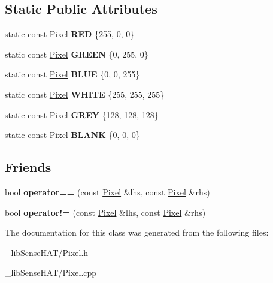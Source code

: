 \subsection*{Static Public Attributes}
\begin{DoxyCompactItemize}
\item 
static const \hyperlink{class_pixel}{Pixel} {\bfseries R\+ED} \{255, 0, 0\}\hypertarget{class_pixel_a0873aef3100f5b2400ee7ca185bf263a}{}\label{class_pixel_a0873aef3100f5b2400ee7ca185bf263a}

\item 
static const \hyperlink{class_pixel}{Pixel} {\bfseries G\+R\+E\+EN} \{0, 255, 0\}\hypertarget{class_pixel_af1e95f87b82dedb916c81f427b3eb68a}{}\label{class_pixel_af1e95f87b82dedb916c81f427b3eb68a}

\item 
static const \hyperlink{class_pixel}{Pixel} {\bfseries B\+L\+UE} \{0, 0, 255\}\hypertarget{class_pixel_a64e919862b4e618715e6d6dba7671112}{}\label{class_pixel_a64e919862b4e618715e6d6dba7671112}

\item 
static const \hyperlink{class_pixel}{Pixel} {\bfseries W\+H\+I\+TE} \{255, 255, 255\}\hypertarget{class_pixel_a12c08beec64c8d57bdd9ef3b49244aa3}{}\label{class_pixel_a12c08beec64c8d57bdd9ef3b49244aa3}

\item 
static const \hyperlink{class_pixel}{Pixel} {\bfseries G\+R\+EY} \{128, 128, 128\}\hypertarget{class_pixel_a67edde6c97818a595235295f750b50fd}{}\label{class_pixel_a67edde6c97818a595235295f750b50fd}

\item 
static const \hyperlink{class_pixel}{Pixel} {\bfseries B\+L\+A\+NK} \{0, 0, 0\}\hypertarget{class_pixel_a77c8aab7dad0995df6fdc8ccf65e92ee}{}\label{class_pixel_a77c8aab7dad0995df6fdc8ccf65e92ee}

\end{DoxyCompactItemize}
\subsection*{Friends}
\begin{DoxyCompactItemize}
\item 
bool {\bfseries operator==} (const \hyperlink{class_pixel}{Pixel} \&lhs, const \hyperlink{class_pixel}{Pixel} \&rhs)\hypertarget{class_pixel_aacd4ab1e37e7b6507b3580d2a3cd0fd9}{}\label{class_pixel_aacd4ab1e37e7b6507b3580d2a3cd0fd9}

\item 
bool {\bfseries operator!=} (const \hyperlink{class_pixel}{Pixel} \&lhs, const \hyperlink{class_pixel}{Pixel} \&rhs)\hypertarget{class_pixel_a96c765b304a1ef8aad3e454b02d21de5}{}\label{class_pixel_a96c765b304a1ef8aad3e454b02d21de5}

\end{DoxyCompactItemize}


The documentation for this class was generated from the following files\+:\begin{DoxyCompactItemize}
\item 
\+\_\+lib\+Sense\+H\+A\+T/Pixel.\+h\item 
\+\_\+lib\+Sense\+H\+A\+T/Pixel.\+cpp\end{DoxyCompactItemize}
